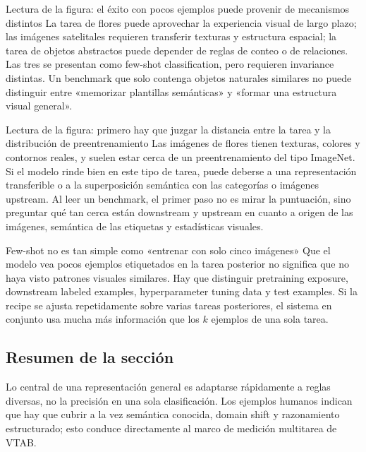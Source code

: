 \begin{knowledgebox}{Lectura de la figura: el éxito con pocos ejemplos puede provenir de mecanismos distintos}
La tarea de flores puede aprovechar la experiencia visual de largo plazo; las imágenes satelitales requieren transferir texturas y estructura espacial; la tarea de objetos abstractos puede depender de reglas de conteo o de relaciones. Las tres se presentan como few-shot classification, pero requieren invariance distintas. Un benchmark que solo contenga objetos naturales similares no puede distinguir entre «memorizar plantillas semánticas» y «formar una estructura visual general».
\end{knowledgebox}


\begin{knowledgebox}{Lectura de la figura: primero hay que juzgar la distancia entre la tarea y la distribución de preentrenamiento}
Las imágenes de flores tienen texturas, colores y contornos reales, y suelen estar cerca de un preentrenamiento del tipo ImageNet. Si el modelo rinde bien en este tipo de tarea, puede deberse a una representación transferible o a la superposición semántica con las categorías o imágenes upstream. Al leer un benchmark, el primer paso no es mirar la puntuación, sino preguntar qué tan cerca están downstream y upstream en cuanto a origen de las imágenes, semántica de las etiquetas y estadísticas visuales.
\end{knowledgebox}


\begin{warningbox}{Few-shot no es tan simple como «entrenar con solo cinco imágenes»}
Que el modelo vea pocos ejemplos etiquetados en la tarea posterior no significa que no haya visto patrones visuales similares. Hay que distinguir pretraining exposure, downstream labeled examples, hyperparameter tuning data y test examples. Si la recipe se ajusta repetidamente sobre varias tareas posteriores, el sistema en conjunto usa mucha más información que los $k$ ejemplos de una sola tarea.
\end{warningbox}

\subsection{Resumen de la sección}

Lo central de una representación general es adaptarse rápidamente a reglas diversas, no la precisión en una sola clasificación. Los ejemplos humanos indican que hay que cubrir a la vez semántica conocida, domain shift y razonamiento estructurado; esto conduce directamente al marco de medición multitarea de VTAB.
